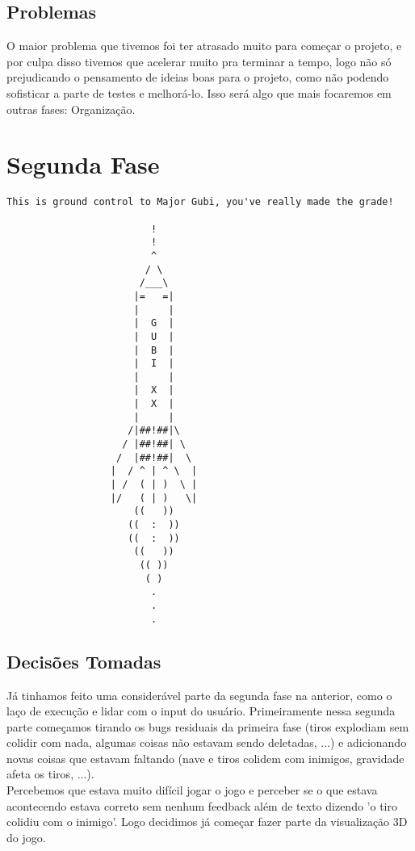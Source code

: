 \documentclass[12pt,a4paper]{article}
\begin{document}
    		\subsection{Problemas}
    		O maior problema que tivemos foi ter atrasado muito para começar o projeto, e por culpa disso
		tivemos que acelerar muito pra terminar a tempo, logo não só prejudicando o pensamento de ideias
		boas para o projeto, como não podendo sofisticar a parte de testes e melhorá-lo. Isso será algo
		que mais focaremos em outras fases: Organização.
	
	\newpage
	\section{Segunda Fase}
	\begin{verbatim}
This is ground control to Major Gubi, you've really made the grade!

                         !
                         !
                         ^
                        / \
                       /___\
                      |=   =|
                      |     |
                      |  G  |
                      |  U  |
                      |  B  |
                      |  I  |
                      |     |
                      |  X  |
                      |  X  |
                      |     |
                     /|##!##|\
                    / |##!##| \
                   /  |##!##|  \
                  |  / ^ | ^ \  |
                  | /  ( | )  \ |
                  |/   ( | )   \|
                      ((   ))
                     ((  :  ))
                     ((  :  ))
                      ((   ))
                       (( ))
                        ( )
                         .
                         .
                         .
	\end{verbatim}
		\subsection{Decisões Tomadas}
		Já tinhamos feito uma considerável parte da segunda fase na anterior, como o laço de execução e
		lidar com o input do usuário. Primeiramente nessa segunda parte começamos tirando os bugs residuais
		da primeira fase (tiros explodiam sem colidir com nada, algumas coisas não estavam sendo deletadas, ...) 
		e adicionando novas coisas que estavam faltando (nave e tiros colidem com inimigos, gravidade afeta os
		tiros, ...).\\
		
    		Percebemos que estava muito difícil jogar o jogo e perceber se o que estava acontecendo estava
		correto sem nenhum feedback além de texto dizendo 'o tiro colidiu com o inimigo'. Logo decidimos já começar
		fazer parte da visualização 3D do jogo.\\
		
\end{document}
